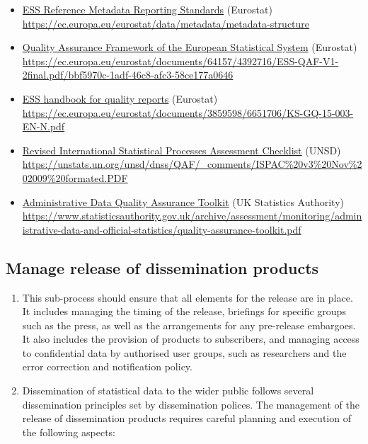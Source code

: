 \documentclass[
]{article}
\begin{document}
\begin{itemize}
\item
  \href{https://ec.europa.eu/eurostat/data/metadata/metadata-structure}{ESS Reference Metadata Reporting
  Standards}
  (Eurostat)\\
  {\url{https://ec.europa.eu/eurostat/data/metadata/metadata-structure}}
\item
  \href{https://ec.europa.eu/eurostat/documents/64157/4392716/ESS-QAF-V1-2final.pdf/bbf5970c-1adf-46c8-afc3-58ce177a0646}{Quality Assurance Framework of the European Statistical
  System}
  (Eurostat){\textbf{\\
  }\url{https://ec.europa.eu/eurostat/documents/64157/4392716/ESS-QAF-V1-2final.pdf/bbf5970c-1adf-46c8-afc3-58ce177a0646}}
\item
  \href{https://ec.europa.eu/eurostat/documents/3859598/6651706/KS-GQ-15-003-EN-N.pdf}{ESS handbook for quality
  reports}
  (Eurostat)\\
  \url{https://ec.europa.eu/eurostat/documents/3859598/6651706/KS-GQ-15-003-EN-N.pdf}
\item
  \href{https://unstats.un.org/unsd/dnss/QAF_comments/ISPAC\%20v3\%20Nov\%202009\%20formated.PDF}{Revised International Statistical Processes Assessment
  Checklist}
  (UNSD)\\
  {\url{https://unstats.un.org/unsd/dnss/QAF/_comments/ISPAC\%20v3\%20Nov\%202009\%20formated.PDF}}
\item
  \href{https://www.statisticsauthority.gov.uk/archive/assessment/monitoring/administrative-data-and-official-statistics/quality-assurance-toolkit.pdf}{Administrative Data Quality Assurance
  Toolkit}
  (UK Statistics Authority)\\
  \url{https://www.statisticsauthority.gov.uk/archive/assessment/monitoring/administrative-data-and-official-statistics/quality-assurance-toolkit.pdf}
\end{itemize}

\hypertarget{manage-release-of-dissemination-products-1}{%
\subsection{Manage release of dissemination products}\label{manage-release-of-dissemination-products-1}}

\begin{enumerate}
\def\labelenumi{\arabic{enumi}.}
\setcounter{enumi}{522}
\item
  This sub-process should ensure that all elements for the release
  are in place. It includes managing the timing of the release,
  briefings for specific groups such as the press, as well as the
  arrangements for any pre-release embargoes. It also includes the
  provision of products to subscribers, and managing access to
  confidential data by authorised user groups, such as researchers and
  the error correction and notification policy.
\item
  Dissemination of statistical data to the wider public follows
  several dissemination principles set by dissemination polices. The
  management of the release of dissemination products requires careful
  planning and execution of the following aspects:
\end{enumerate}
\end{document}
